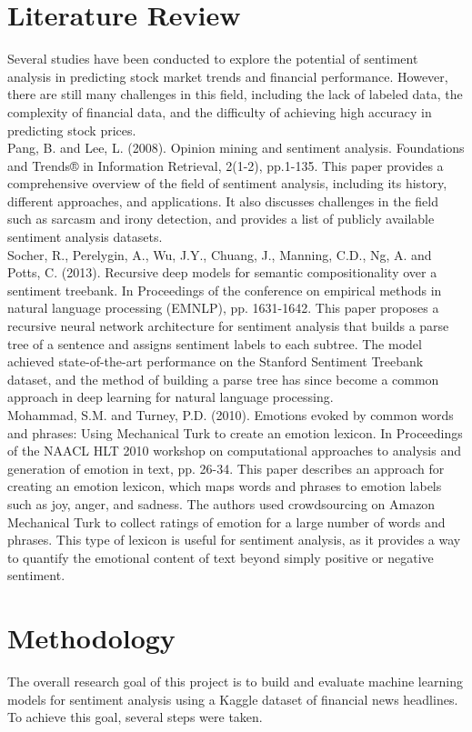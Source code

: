 \documentclass[12pt]{article}
\begin{document}
\section{Literature Review}
Several studies have been conducted to explore the potential of sentiment analysis in predicting stock market trends and financial performance. However, there are still many challenges in this field, including the lack of labeled data, the complexity of financial data, and the difficulty of achieving high accuracy in predicting stock prices.
\\
Pang, B. and Lee, L. (2008). Opinion mining and sentiment analysis. Foundations and Trends® in Information Retrieval, 2(1-2), pp.1-135.
This paper provides a comprehensive overview of the field of sentiment analysis, including its history, different approaches, and applications. It also discusses challenges in the field such as sarcasm and irony detection, and provides a list of publicly available sentiment analysis datasets.
\\
Socher, R., Perelygin, A., Wu, J.Y., Chuang, J., Manning, C.D., Ng, A. and Potts, C. (2013). Recursive deep models for semantic compositionality over a sentiment treebank. In Proceedings of the conference on empirical methods in natural language processing (EMNLP), pp. 1631-1642.
This paper proposes a recursive neural network architecture for sentiment analysis that builds a parse tree of a sentence and assigns sentiment labels to each subtree. The model achieved state-of-the-art performance on the Stanford Sentiment Treebank dataset, and the method of building a parse tree has since become a common approach in deep learning for natural language processing.
\\
Mohammad, S.M. and Turney, P.D. (2010). Emotions evoked by common words and phrases: Using Mechanical Turk to create an emotion lexicon. In Proceedings of the NAACL HLT 2010 workshop on computational approaches to analysis and generation of emotion in text, pp. 26-34.
This paper describes an approach for creating an emotion lexicon, which maps words and phrases to emotion labels such as joy, anger, and sadness. The authors used crowdsourcing on Amazon Mechanical Turk to collect ratings of emotion for a large number of words and phrases. This type of lexicon is useful for sentiment analysis, as it provides a way to quantify the emotional content of text beyond simply positive or negative sentiment.
\section{Methodology}
The overall research goal of this project is to build and evaluate machine learning models for sentiment analysis using a Kaggle dataset of financial news headlines. To achieve this goal, several steps were taken.
\end{document}
